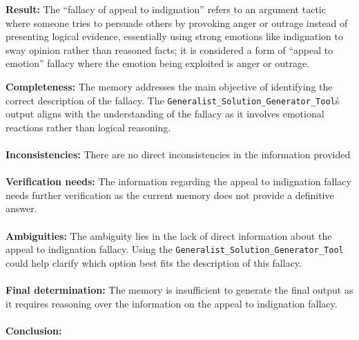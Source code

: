 \begin{executorbox}
\textbf{Result:} The ``fallacy of appeal to indignation'' refers to an argument tactic where someone tries to persuade others by provoking anger or outrage instead of presenting logical evidence, essentially using strong emotions like indignation to sway opinion rather than reasoned facts; it is considered a form of ``appeal to emotion'' fallacy where the emotion being exploited is anger or outrage. 
\end{executorbox}


\begin{plannerbox}

\textbf{Completeness:}
The memory addresses the main objective of identifying the correct description of the fallacy. The \texttt{Generalist\_Solution\_Generator\_Tool}\'s output aligns with the understanding of the fallacy as it involves emotional reactions rather than logical reasoning.
\\\\
\textbf{Inconsistencies:}
There are no direct inconsistencies in the information provided
\\\\
\textbf{Verification needs:}
The information regarding the appeal to indignation fallacy needs further verification as the current memory does not provide a definitive answer.
\\\\
\textbf{Ambiguities:}
 The ambiguity lies in the lack of direct information about the appeal to indignation fallacy. Using the \texttt{Generalist\_Solution\_Generator\_Tool} could help clarify which option best fits the description of this fallacy.
\\\\
\textbf{Final determination:}
The memory is insufficient to generate the final output as it requires reasoning over the information on the appeal to indignation fallacy.
\\\\
\textbf{Conclusion:} 
\end{plannerbox}

